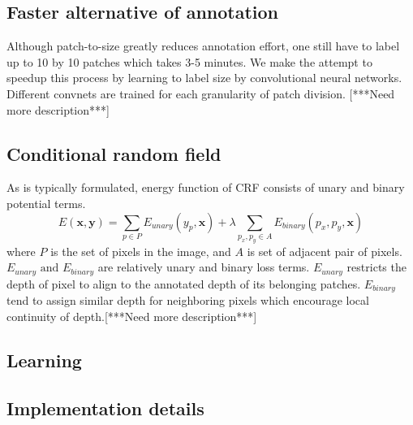 \documentclass[10pt,twocolumn,letterpaper]{article}
\begin{document}
\subsection{Faster alternative of annotation}
Although patch-to-size greatly reduces annotation effort, one still have to label up to 10 by 10 patches which takes 3-5 minutes. We make the attempt to speedup this process by learning to label size by convolutional neural networks. Different convnets are trained for each granularity of patch division. [***Need more description***]
\subsection{Conditional random field}
As is typically formulated, energy function of CRF consists of unary and binary potential terms. 
\begin{equation}
E(\mathbf{x}, \mathbf{y}) = \sum_{p \in P}E_{unary}(y_{p}, \mathbf{x}) + \lambda \sum_{p_x, p_y \in A} E_{binary}(p_x, p_y, \mathbf{x})
\end{equation}
where $P$ is the set of pixels in the image, and $A$ is set of adjacent pair of pixels. $E_{unary}\text{ and }E_{binary}$ are relatively unary and binary loss terms. $E_{unary}$ restricts the depth of pixel to align to the annotated depth of its belonging patches. $E_{binary}$ tend to assign similar depth for neighboring pixels which encourage local continuity of depth.[***Need more description***]
\subsection{Learning}
\subsection{Implementation details}


{\small


}
\end{document}
